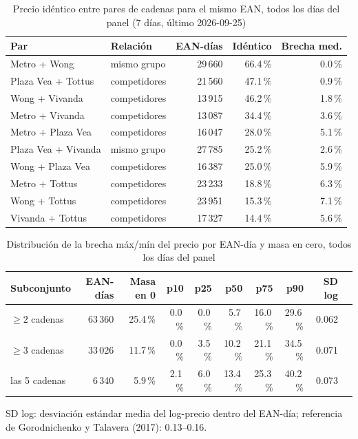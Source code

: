 
\begin{table}[htbp]
\caption{Precio id\'entico entre pares de cadenas para el mismo EAN, todos los d\'ias del panel (7 d\'ias, \'ultimo 2026-09-25)}
\label{tab:identidad}
\centering\scriptsize\setlength{\tabcolsep}{3pt}
\begin{tabular}{@{}llrrr@{}}
\toprule
Par & Relaci\'on & EAN-d\'ias & Id\'entico & Brecha med. \\
\midrule
Metro + Wong & mismo grupo & 29\,660 & 66.4\,\% & 0.0\,\% \\
Plaza Vea + Tottus & competidores & 21\,560 & 47.1\,\% & 0.9\,\% \\
Wong + Vivanda & competidores & 13\,915 & 46.2\,\% & 1.8\,\% \\
Metro + Vivanda & competidores & 13\,087 & 34.4\,\% & 3.6\,\% \\
Metro + Plaza Vea & competidores & 16\,047 & 28.0\,\% & 5.1\,\% \\
Plaza Vea + Vivanda & mismo grupo & 27\,785 & 25.2\,\% & 2.6\,\% \\
Wong + Plaza Vea & competidores & 16\,387 & 25.0\,\% & 5.9\,\% \\
Metro + Tottus & competidores & 23\,233 & 18.8\,\% & 6.3\,\% \\
Wong + Tottus & competidores & 23\,951 & 15.3\,\% & 7.1\,\% \\
Vivanda + Tottus & competidores & 17\,327 & 14.4\,\% & 5.6\,\% \\
\bottomrule\end{tabular}\end{table}

\begin{table}[t]
\caption{Distribuci\'on de la brecha m\'ax/m\'in del precio por EAN-d\'ia y masa en cero, todos los d\'ias del panel}
\label{tab:brecha}
\centering\scriptsize\setlength{\tabcolsep}{4pt}
\begin{tabular}{@{}lrrrrrrrrr@{}}
\toprule
Subconjunto & EAN-d\'ias & Masa en 0 & p10 & p25 & p50 & p75 & p90 & SD log \\
\midrule
$\geq 2$ cadenas & 63\,360 & 25.4\,\% & 0.0\,\% & 0.0\,\% & 5.7\,\% & 16.0\,\% & 29.6\,\% & 0.062 \\
$\geq 3$ cadenas & 33\,026 & 11.7\,\% & 0.0\,\% & 3.5\,\% & 10.2\,\% & 21.1\,\% & 34.5\,\% & 0.071 \\
las 5 cadenas & 6\,340 & 5.9\,\% & 2.1\,\% & 6.0\,\% & 13.4\,\% & 25.3\,\% & 40.2\,\% & 0.073 \\
\bottomrule\end{tabular}
\par\smallskip\raggedright\scriptsize SD log: desviaci\'on est\'andar media del log-precio dentro del EAN-d\'ia; referencia de Gorodnichenko y Talavera (2017): 0.13--0.16.
\end{table}

